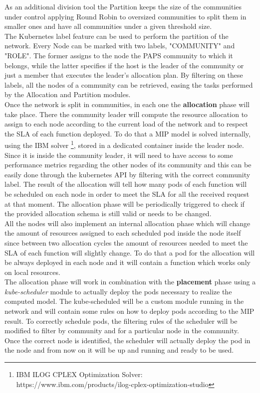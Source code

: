 As an additional division tool the Partition keeps the size of the communities under control
applying Round Robin to oversized communities to split them in smaller ones and have all 
communities under a given threshold size.\\
The Kubernetes label feature can be used to perform the partition of the network.
Every Node can be marked with two labels, "COMMUNITY" and "ROLE". The former assigns to the node 
the PAPS community to which it belongs, while the latter specifies if the host is the leader of the
community or just a member that executes the leader's allocation plan.
By filtering on these labels, all the nodes of a community can be retrieved, easing the tasks performed 
by the Allocation and Partition modules.
\\

Once the network is split in communities, in each one the \textbf{allocation} phase will take
place. There the community leader will compute the resource allocation to assign to each node
according to the current load of the network and to respect the SLA of each function deployed.
To do that a MIP model is solved internally, using the IBM solver \footnote{IBM ILOG CPLEX 
Optimization Solver: https://www.ibm.com/products/ilog-cplex-optimization-studio}, stored in 
a dedicated container inside the leader node. Since it is inside the community leader, it 
will need to have access to some performance metrics regarding the other nodes of its community
and this can be easily done through the kubernetes API by filtering with the correct community
label. The result of the allocation will tell how many pods of each function will be scheduled
on each node in order to meet the SLA for all the received request at that moment.
The allocation phase will be periodically triggered to check if the provided allocation
schema is still valid or needs to be changed. \\
All the nodes will also implement an internal allocation phase which will change the amount 
of resources assigned to each scheduled pod inside the node itself since between two 
allocation cycles the amount of resources needed to meet the SLA of each function will 
slightly change. To do that a pod for the allocation will be always deployed in each node
and it will contain a function which works only on local resources.\\

The allocation phase will work in combination with the \textbf{placement} phase using a
\textit{kube-scheduler} module to actually deploy the pods necessary to realize the 
computed model. The kube-scheduled will be a custom module running in the network and will
contain some rules on how to deploy pods according to the MIP result. To correctly schedule 
pods, the filtering rules of the scheduler will be modified to filter by community and for 
a particular node in the community. Once the correct node is identified, the scheduler will 
actually deploy the pod in the node and from now on it will be up and running and ready to 
be used. \\

